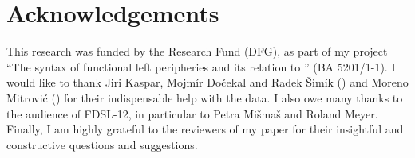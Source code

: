 \documentclass[output=paper,modfonts, hidelinks, newtxmath]{langscibook}
\begin{document}
\section*{Acknowledgements}
This research was funded by the  Research Fund (DFG), as part of my project ``The syntax of functional left peripheries and its relation to '' (BA 5201/1-1). I would like to thank Jiri Kaspar,  Mojmír Dočekal and Radek Šimík () and Moreno Mitrović () for their indispensable help with the data. I also owe many thanks to the audience of FDSL-12, in particular to Petra Mišmaš and Roland Meyer. Finally, I am highly grateful to the reviewers of my paper for their insightful and constructive questions and suggestions.

\sloppy
\printbibliography[heading=subbibliography,notkeyword=this]
\end{document}
